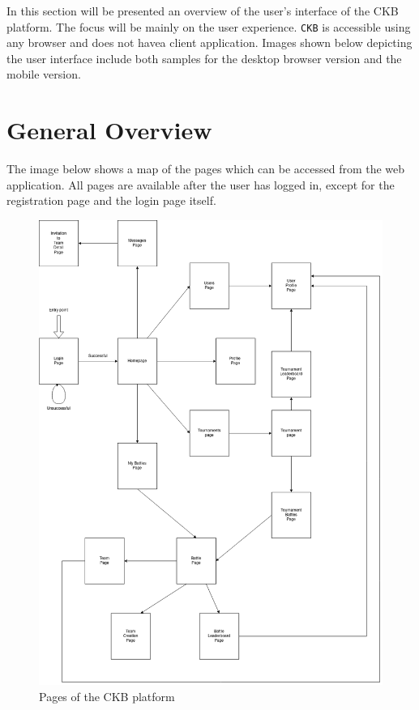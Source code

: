 In this section will be presented an overview of the user’s interface of the CKB platform.
The focus will be mainly on the user experience. 
\verb|CKB| is accessible using any browser and does not havea client application.
Images shown below depicting the user interface include both samples for the desktop browser version and the mobile version.

\section{General Overview}
\label{sec: general_overview}%
The image below shows a map of the pages which can be accessed from the web application.
All pages are available after the user has logged in, except for the registration page and the login page itself.

\begin{figure} [H]
    \begin{center}
        \includegraphics[width=1\linewidth]{Images/designmap.png}
        \caption{Pages of the CKB platform}
        \label{fig: designmap}
    \end{center}
\end{figure}

